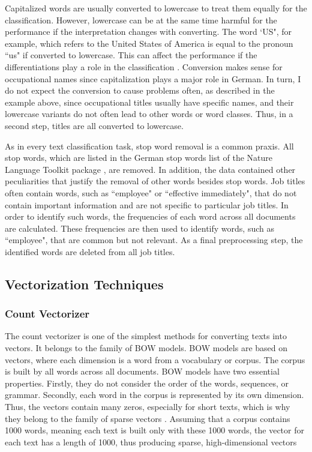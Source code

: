 \documentclass[12pt, a4paper, titlepage]{article}
\begin{document}
Capitalized words are usually converted to lowercase to treat them equally for the classification. However, lowercase can be at the same time harmful for the performance if the interpretation changes with converting. The word `US", for example, which refers to the United States of America is equal to the pronoun ``us" if converted to lowercase. This can affect the performance if the differentiations play a role in the classification \citep{kowsari2019text}. Conversion makes sense for occupational names since capitalization plays a major role in German. In turn, I do not expect the conversion to cause problems often, as described in the example above, since occupational titles usually have specific names, and their lowercase variants do not often lead to other words or word classes. Thus, in a second step, titles are all converted to lowercase. 

As in every text classification task, stop word removal is a common praxis. All stop words, which are listed in the German stop words list of the Nature Language Toolkit package \citep{bird2009}, are removed. In addition, the data contained other peculiarities that justify the removal of other words besides stop words. Job titles often contain words, such as ``employee" or ``effective immediately", that do not contain important information and are not specific to particular job titles. In order to identify such words, the frequencies of each word across all documents are calculated. These frequencies are then used to identify words, such as ``employee", that are common but not relevant. As a final preprocessing step, the identified words are deleted from all job titles.  

\subsection{Vectorization Techniques}
\subsubsection*{Count Vectorizer}
The count vectorizer is one of the simplest methods for converting texts into vectors. It belongs to the family of \ac{BOW} models. \ac{BOW} models are based on vectors, where each dimension is a word from a vocabulary or corpus. The corpus is built by all words across all documents. \ac{BOW} models have two essential properties. Firstly, they do not consider the order of the words, sequences, or grammar. Secondly, each word in the corpus is represented by its own dimension. Thus, the vectors contain many zeros, especially for short texts, which is why they belong to the family of sparse vectors \citep{ajose2020}. Assuming that a corpus contains 1000 words, meaning each text is built only with these 1000 words, the vector for each text has a length of 1000, thus producing sparse, high-dimensional vectors \citep{kulkarni2021, sarkar2016}
\end{document}

